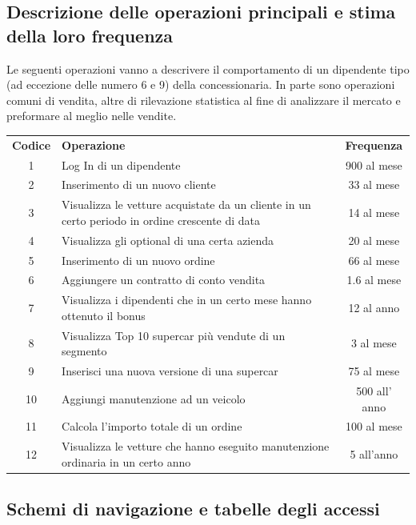 \documentclass[11pt]{article}
\begin{document}
\newpage

\subsection{Descrizione delle operazioni principali e stima della loro frequenza}

Le seguenti operazioni vanno a descrivere il comportamento di un dipendente tipo
(ad eccezione delle numero 6 e 9) della concessionaria. In parte sono operazioni
comuni di vendita, altre di rilevazione statistica al fine di analizzare il
mercato e preformare al meglio nelle vendite. 

\begin{table}[htbp]
    \centering
    \small
    \begin{tabularx}{\linewidth}{c X c}
      \rowcolor{red!20!}
      \textbf{Codice} & \textbf{Operazione} & \textbf{Frequenza} \\
      1 & Log In di un dipendente & 900 al mese \\
      2 & Inserimento di un nuovo cliente & 33 al mese \\
      3 & Visualizza le vetture acquistate da un cliente in un certo periodo in
      ordine crescente di data & 14 al mese \\
      4 & Visualizza gli optional di una certa azienda & 20 al mese \\
      5 & Inserimento di un nuovo ordine & 66 al mese \\
      6 & Aggiungere un contratto di conto vendita & 1.6 al mese \\
      7 & Visualizza i dipendenti che in un certo mese hanno ottenuto il bonus & 12
      al anno \\
      8 & Visualizza Top 10 supercar più vendute di un segmento & 3 al mese \\
      9 & Inserisci una nuova versione di una supercar & 75 al mese \\
      10 & Aggiungi manutenzione ad un veicolo & 500 all' anno \\
      11 & Calcola l'importo totale di un ordine & 100 al mese \\
      12 & Visualizza le vetture che hanno eseguito manutenzione ordinaria in un
      certo anno & 5 all'anno \\
    \end{tabularx}
    \label{tab:tabella_frequenze}
\end{table}
\subsection{Schemi di navigazione e tabelle degli accessi}
\end{document}
